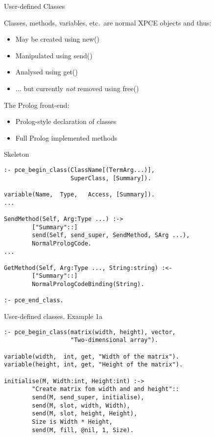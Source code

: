 
\begin{sli}{User-defined Classes}

Classes, methods, variables, etc.\ are normal XPCE objects and
thus:

\begin{itemize}
    \item May be created using new()
    \item Manipulated using send()
    \item Analysed using get()
    \item ... but currently {\em not} removed using free()
\end{itemize}

The Prolog front-end:

\begin{itemize}
    \item Prolog-style declaration of classes
    \item Full Prolog implemented methods
\end{itemize}
\end{sli}

\begin{sli}{Skeleton}

\begin{verbatim}
:- pce_begin_class(ClassName[(TermArg...)],
                   SuperClass, [Summary]).

variable(Name,  Type,   Access, [Summary]).
...

SendMethod(Self, Arg:Type ...) :->
        ["Summary"::]
        send(Self, send_super, SendMethod, SArg ...),
        NormalPrologCode.
...

GetMethod(Self, Arg:Type ..., String:string) :<-
        ["Summary"::]
        NormalPrologCodeBinding(String).

:- pce_end_class.
\end{verbatim}

\noindent
\end{sli}


\begin{sli}{User-defined classes. Example 1a}

\begin{verbatim}
:- pce_begin_class(matrix(width, height), vector,
                   "Two-dimensional array").

variable(width,  int, get, "Width of the matrix").
variable(height, int, get, "Height of the matrix").

initialise(M, Width:int, Height:int) :->
        "Create matrix fom width and and height"::
        send(M, send_super, initialise),
        send(M, slot, width, Width),
        send(M, slot, height, Height),
        Size is Width * Height,
        send(M, fill, @nil, 1, Size).
\end{verbatim}

\noindent
\end{sli}

